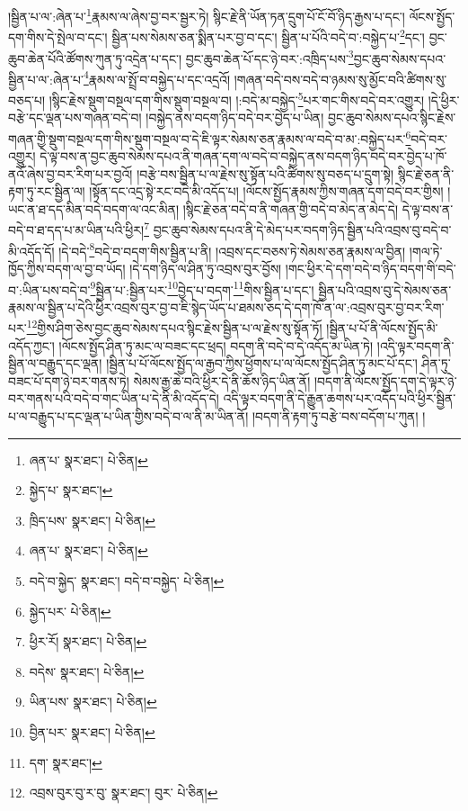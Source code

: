 །སྦྱིན་པ་ལ་:ཞེན་པ་\footnote{ཞན་པ་  སྣར་ཐང་།  པེ་ཅིན། }རྣམས་ལ་ཞེས་བྱ་བར་སྦྱར་ཏེ། སྙིང་རྗེ་ནི་ཡོན་ཏན་དྲུག་པོ་ངོ་བོ་ཉིད་རྒྱས་པ་དང་། ལོངས་སྤྱོད་དག་གིས་དེ་སྤེལ་བ་དང་། སྦྱིན་པས་སེམས་ཅན་སྨིན་པར་བྱ་བ་དང་། སྦྱིན་པ་པོའི་བདེ་བ་:བསྐྱེད་པ་\footnote{སྐྱེད་པ་  སྣར་ཐང་། }དང་། བྱང་ཆུབ་ཆེན་པོའི་ཚོགས་ཀུན་ཏུ་འདྲེན་པ་དང་། བྱང་ཆུབ་ཆེན་པོ་དང་ཉེ་བར་:འཁྲིད་པས་\footnote{ཁྲིད་པས་  སྣར་ཐང་།  པེ་ཅིན། }བྱང་ཆུབ་སེམས་དཔའ་སྦྱིན་པ་ལ་:ཞེན་པ་\footnote{ཞན་པ་  སྣར་ཐང་།  པེ་ཅིན། }རྣམས་ལ་སྤྲོ་བ་བསྐྱེད་པ་དང་འདྲའོ། །གཞན་བདེ་བས་བདེ་བ་ཉམས་སུ་མྱོང་བའི་ཚིགས་སུ་བཅད་པ། །སྙིང་རྗེས་སྡུག་བསྔལ་དག་གིས་སྡུག་བསྔལ་བ། །:བདེ་མ་བསྐྱེད་\footnote{བདེ་བ་སྐྱེད་  སྣར་ཐང་། བདེ་བ་བསྐྱེད་  པེ་ཅིན། }པར་གང་གིས་བདེ་བར་འགྱུར། །དེ་ཕྱིར་བརྩེ་དང་ལྡན་པས་གཞན་བདེ་བ། །བསྐྱེད་ནས་བདག་ཉིད་བདེ་བར་བྱེད་པ་ཡིན། བྱང་ཆུབ་སེམས་དཔའ་སྙིང་རྗེས་གཞན་གྱི་སྡུག་བསྔལ་དག་གིས་སྡུག་བསྔལ་བ་དེ་ཇི་ལྟར་སེམས་ཅན་རྣམས་ལ་བདེ་བ་མ་:བསྐྱེད་པར་\footnote{སྐྱེད་པར་  པེ་ཅིན། }བདེ་བར་འགྱུར། དེ་ལྟ་བས་ན་བྱང་ཆུབ་སེམས་དཔའ་ནི་གཞན་དག་ལ་བདེ་བ་བསྐྱེད་ནས་བདག་ཉིད་བདེ་བར་བྱེད་པ་ཁོ་ནའོ་ཞེས་བྱ་བར་རིག་པར་བྱའོ། །བརྩེ་བས་སྦྱིན་པ་ལ་རྗེས་སུ་སྟོན་པའི་ཚིགས་སུ་བཅད་པ་དྲུག་སྟེ། སྙིང་རྗེ་ཅན་ནི་རྟག་ཏུ་རང་སྦྱིན་ལ། །སྟོན་དང་འདྲ་སྟེ་རང་བདེ་མི་འདོད་པ། །ལོངས་སྤྱོད་རྣམས་ཀྱིས་གཞན་དག་བདེ་བར་གྱིས། །ཡང་ན་ཐ་དད་མིན་བདེ་བདག་ལ་འང་མིན། །སྙིང་རྗེ་ཅན་བདེ་བ་ནི་གཞན་གྱི་བདེ་བ་མེད་ན་མེད་དེ། དེ་ལྟ་བས་ན་བདེ་བ་ཐ་དད་པ་མ་ཡིན་པའི་ཕྱིར།\footnote{ཕྱིར་རོ།  སྣར་ཐང་།  པེ་ཅིན། } བྱང་ཆུབ་སེམས་དཔའ་ནི་དེ་མེད་པར་བདག་ཉིད་སྦྱིན་པའི་འབྲས་བུ་བདེ་བ་མི་འདོད་དོ། །དེ་བདེ་\footnote{བདེས་  སྣར་ཐང་།  པེ་ཅིན། }བདེ་བ་བདག་གིས་སྦྱིན་པ་ནི། །འབྲས་དང་བཅས་ཏེ་སེམས་ཅན་རྣམས་ལ་བྱིན། །གལ་ཏེ་ཁྱོད་ཀྱིས་བདག་ལ་བྱ་བ་ཡོད། །དེ་དག་ཉིད་ལ་ཤིན་ཏུ་འབྲས་བུར་བྱོས། །གང་ཕྱིར་དེ་དག་བདེ་བ་ཉིད་བདག་གི་བདེ་བ་:ཡིན་པས་བདེ་བ་\footnote{ཡིན་པས་  སྣར་ཐང་།  པེ་ཅིན། }སྦྱིན་པ་:སྦྱིན་པར་\footnote{བྱིན་པར་  སྣར་ཐང་།  པེ་ཅིན། }བྱེད་པ་བདག་\footnote{དག་  སྣར་ཐང་། }གིས་སྦྱིན་པ་དང་། སྦྱིན་པའི་འབྲས་བུ་དེ་སེམས་ཅན་རྣམས་ལ་སྦྱིན་པ་དེའི་ཕྱིར་འབྲས་བུར་བྱ་བ་ཇི་སྙེད་ཡོད་པ་ཐམས་ཅད་དེ་དག་ཁོ་ན་ལ་:འབྲས་བུར་བྱ་བར་རིག་པར་\footnote{འབྲས་བུར་བུ་ར་བུ་  སྣར་ཐང་། བུར་  པེ་ཅིན། }གྱིས་ཤིག་ཅེས་བྱང་ཆུབ་སེམས་དཔའ་སྙིང་རྗེས་སྦྱིན་པ་ལ་རྗེས་སུ་སྟོན་ཏོ། །སྦྱིན་པ་པོ་ནི་ལོངས་སྤྱོད་མི་འདོད་ཀྱང་། །ལོངས་སྤྱོད་ཤིན་ཏུ་མང་ལ་བཟང་དང་ཕྲད། བདག་ནི་བདེ་བ་དེ་འདོད་མ་ཡིན་ཏེ། །འདི་ལྟར་བདག་ནི་སྦྱིན་ལ་བརྒྱུད་དང་ལྡན། །སྦྱིན་པ་པོ་ལོངས་སྤྱོད་ལ་རྒྱབ་ཀྱིས་ཕྱོགས་པ་ལ་ལོངས་སྤྱོད་ཤིན་ཏུ་མང་པོ་དང་། ཤིན་ཏུ་བཟང་པོ་དག་ཉེ་བར་གནས་ཏེ། སེམས་རྒྱ་ཆེ་བའི་ཕྱིར་དེ་ནི་ཆོས་ཉིད་ཡིན་ནོ། །བདག་ནི་ལོངས་སྤྱོད་དག་དེ་ལྟར་ཉེ་བར་གནས་པའི་བདེ་བ་གང་ཡིན་པ་དེ་ནི་མི་འདོད་དེ། འདི་ལྟར་བདག་ནི་དེ་རྒྱུན་ཆགས་པར་འདོད་པའི་ཕྱིར་སྦྱིན་པ་ལ་བརྒྱུད་པ་དང་ལྡན་པ་ཡིན་གྱིས་བདེ་བ་ལ་ནི་མ་ཡིན་ནོ། །བདག་ནི་རྟག་ཏུ་བརྩེ་བས་བདོག་པ་ཀུན། །
